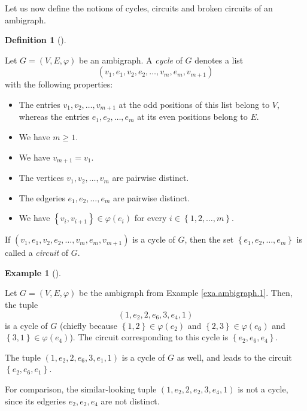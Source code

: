 \documentclass[numbers=enddot,12pt,final,onecolumn,notitlepage]{scrartcl}%
\theoremstyle{definition}
\newtheorem{defi}[theo]{Definition}
\newenvironment{definition}[1][]
{\begin{defi}[#1]\begin{leftbar}}
{\end{leftbar}\end{defi}}
\newtheorem{exmp}[theo]{Example}
\newenvironment{example}[1][]
{\begin{exmp}[#1]\begin{leftbar}}
{\end{leftbar}\end{exmp}}
\begin{document}
Let us now define the notions of cycles, circuits and broken circuits of an ambigraph.

\begin{definition}
\label{def.ambigraph.cycle}Let $G=\left(  V,E,\varphi\right)  $ be an
ambigraph. A \emph{cycle} of $G$ denotes a list
\[
\left(  v_{1},e_{1},v_{2},e_{2},\ldots,v_{m},e_{m},v_{m+1}\right)
\]
with the following properties:

\begin{itemize}
\item The entries $v_{1},v_{2},\ldots,v_{m+1}$ at the odd positions of this
list belong to $V$, whereas the entries $e_{1},e_{2},\ldots,e_{m}$ at its even
positions belong to $E$.

\item We have $m\geq1$.

\item We have $v_{m+1}=v_{1}$.

\item The vertices $v_{1},v_{2},\ldots,v_{m}$ are pairwise distinct.

\item The edgeries $e_{1},e_{2},\ldots,e_{m}$ are pairwise distinct.

\item We have $\left\{  v_{i},v_{i+1}\right\}  \in\varphi\left(  e_{i}\right)
$ for every $i\in\left\{  1,2,\ldots,m\right\}  $.
\end{itemize}

If $\left(  v_{1},e_{1},v_{2},e_{2},\ldots,v_{m},e_{m},v_{m+1}\right)  $ is a
cycle of $G$, then the set $\left\{  e_{1},e_{2},\ldots,e_{m}\right\}  $ is
called a \emph{circuit} of $G$.
\end{definition}

\begin{example}
\label{exa.ambigraph.cycle.1}Let $G=\left(  V,E,\varphi\right)  $ be the
ambigraph from Example \ref{exa.ambigraph.1}. Then, the tuple%
\[
\left(  1,e_{2},2,e_{6},3,e_{4},1\right)
\]
is a cycle of $G$ (chiefly because $\left\{  1,2\right\}  \in\varphi\left(
e_{2}\right)  $ and $\left\{  2,3\right\}  \in\varphi\left(  e_{6}\right)  $
and $\left\{  3,1\right\}  \in\varphi\left(  e_{4}\right)  $). The circuit
corresponding to this cycle is $\left\{  e_{2},e_{6},e_{4}\right\}  $.

The tuple $\left(  1,e_{2},2,e_{6},3,e_{1},1\right)  $ is a cycle of $G$ as
well, and leads to the circuit $\left\{  e_{2},e_{6},e_{1}\right\}  $.

For comparison, the similar-looking tuple $\left(  1,e_{2},2,e_{2}%
,3,e_{4},1\right)  $ is not a cycle, since its edgeries $e_{2},e_{2},e_{4}$
are not distinct.
\end{example}
\end{document}
